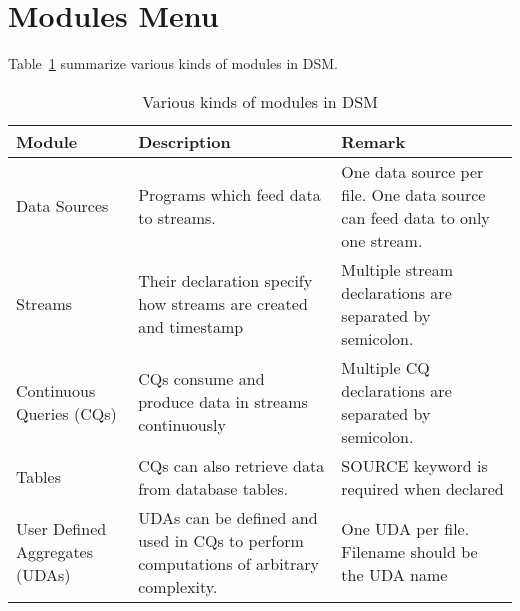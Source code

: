 \documentclass[10pt]{article}
\begin{document}
\section{Modules Menu}
\label{sec:module}
Table~\ref{tab:module} summarize various kinds of modules in DSM.
\begin{table}
\begin{tabular}{|p{2.5cm}|p{5cm}|p{3cm}|}
\hline
Module & Description & Remark\\
\hline
Data Sources & Programs which feed data to streams. & One data source per file.  One data source can feed data to only one stream.\\
\hline
Streams & Their declaration specify how streams are created and timestamp & Multiple stream declarations are separated by semicolon.\\
\hline
Continuous Queries (CQs) &  CQs consume and produce data in streams continuously & Multiple CQ declarations are separated by semicolon.\\
 \hline
Tables & CQs can also retrieve data from database tables. & SOURCE keyword is required when declared\\
\hline
User Defined Aggregates (UDAs) & UDAs can be defined and used in CQs to perform computations of arbitrary complexity.& One UDA per file.  Filename should be the UDA name\\
\hline
\end{tabular}
\caption{Various kinds of modules in DSM}
\label{tab:module}
\end{table}
\end{document}
